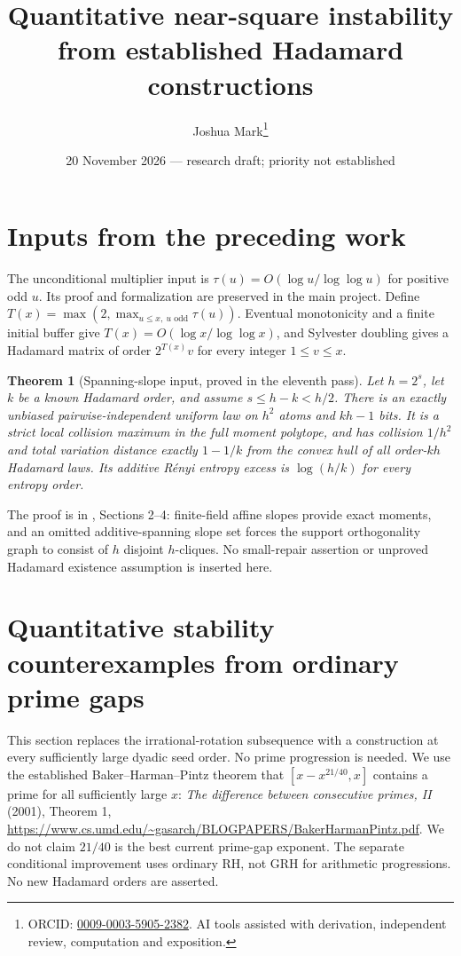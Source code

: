 \documentclass[11pt]{article}
\title{Quantitative near-square instability\\from established Hadamard constructions}
\author{Joshua Mark\thanks{ORCID: \href{https://orcid.org/0009-0003-5905-2382}{0009-0003-5905-2382}. AI tools assisted with derivation, independent review, computation and exposition.}}
\date{20 November 2026 --- research draft; priority not established}
\newtheorem{theorem}{Theorem}[section]
\begin{document}
\maketitle

\section*{Inputs from the preceding work}
The unconditional multiplier input is
$\tau(u)=O(\log u/\log\log u)$ for positive odd $u$.
Its proof and formalization are preserved in the main project.
Define $T(x)=\max(2,\max_{u\le x,\ u\text{ odd}}\tau(u))$.
Eventual monotonicity and a finite initial buffer give
$T(x)=O(\log x/\log\log x)$, and Sylvester doubling gives
a Hadamard matrix of order $2^{T(x)}v$ for every integer $1\le v\le x$.

\begin{theorem}[Spanning-slope input, proved in the eleventh pass]
\label{thm:design-spanning-slopes}
Let $h=2^s$, let $k$ be a known Hadamard order, and assume
$s\le h-k<h/2$. There is an exactly unbiased pairwise-independent
uniform law on $h^2$ atoms and $kh-1$ bits. It is a strict local
collision maximum in the full moment polytope, and has collision
$1/h^2$ and total variation distance exactly $1-1/k$ from the convex
hull of all order-$kh$ Hadamard laws. Its additive R\'enyi entropy
excess is $\log(h/k)$ for every entropy order.
\end{theorem}
The proof is in , Sections 2--4:
finite-field affine slopes provide exact moments, and an omitted
additive-spanning slope set forces the support orthogonality graph
to consist of $h$ disjoint $h$-cliques. No small-repair assertion
or unproved Hadamard existence assumption is inserted here.
\section{Quantitative stability counterexamples from ordinary prime gaps}
\label{sec:stability-prime-gaps}
This section replaces the irrational-rotation subsequence with a construction
at every sufficiently large dyadic seed order. No prime progression is
needed. We use the established Baker--Harman--Pintz theorem that
$[x-x^{21/40},x]$ contains a prime for all sufficiently large $x$:
\emph{The difference between consecutive primes, II} (2001), Theorem 1,
\url{https://www.cs.umd.edu/~gasarch/BLOGPAPERS/BakerHarmanPintz.pdf}.
We do not claim $21/40$ is the best current prime-gap exponent.
The separate conditional improvement uses ordinary RH, not GRH for
arithmetic progressions. No new Hadamard orders are asserted.
\end{document}
